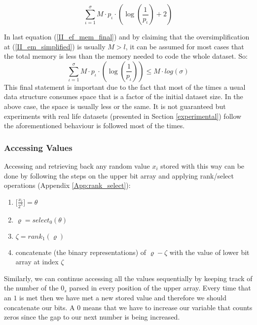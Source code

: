 \begin{equation} \label{II_ef_mem_final}
	\sum_{\iota = 1}^{\sigma} M\cdot p_{\iota}\cdot ( \log(\frac{1}{p_{\iota}}) + 2 )
\end{equation}

In last equation (\ref{II_ef_mem_final}) and by claiming that the oversimplification at (\ref{II_em_simplified}) is usually \(M > l \), it can be assumed for most cases that the total memory is less than the memory needed to code the whole dataset. So:
\begin{equation}
	\sum_{\iota = 1}^{\sigma} M\cdot p_{\iota}\cdot ( \log(\frac{1}{p_{\iota}})) \leq M\cdot log(\sigma)
\end{equation}
This final statement is important due to the fact that most of the times a usual data structure consumes space that is a factor of the initial dataset size. In the above case, the space is usually less or the same. It is not guaranteed but experiments with real life datasets (presented in Section \ref{experimental}) follow the aforementioned behaviour is followed most of the times.
\subsubsection{Accessing Values}
\par Accessing and retrieving back any random value \(x_i\) stored with this way can be done  by following the steps on the upper bit array and applying rank/select operations (Appendix \ref{App:rank_select}):
\begin{enumerate}
	\item \(\lbrack \frac{x_i}{2^{\lambda}} \rbrack = \theta \)
	\item \(\varrho = select_0(\theta)\)
	\item \(\zeta = rank_1(\varrho)\)
	\item concatenate (the binary representations) of \(\varrho - \zeta\) with the value of lower bit array at index \(\zeta\)
\end{enumerate}
Similarly, we can continue accessing all the values sequentially by keeping track of the number of the $0_s$ parsed in every position of the upper array. Every time that an $1$ is met then we have met a new stored value and therefore we should concatenate our bits. A $0$ means that we have to increase our variable that counts zeros since the gap to our next number is being increased.
